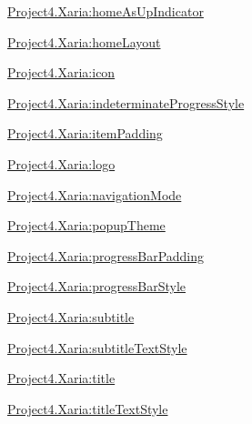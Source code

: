 {\ttfamily \hyperlink{classproject4_1_1xaria_1_1R_1_1styleable_ab5053df37af5d2ea8d603211b589c775}{Project4.\+Xaria\+:home\+As\+Up\+Indicator}}

{\ttfamily \hyperlink{classproject4_1_1xaria_1_1R_1_1styleable_a3c2746f97e4f1d93ae4fd7b0a94e055c}{Project4.\+Xaria\+:home\+Layout}}

{\ttfamily \hyperlink{classproject4_1_1xaria_1_1R_1_1styleable_ac5aaeb633d4d1312de58e956afac37b1}{Project4.\+Xaria\+:icon}}

{\ttfamily \hyperlink{classproject4_1_1xaria_1_1R_1_1styleable_a7b820690f429621509300f757ddbd3da}{Project4.\+Xaria\+:indeterminate\+Progress\+Style}}

{\ttfamily \hyperlink{classproject4_1_1xaria_1_1R_1_1styleable_afead372bec08fa28b16df291eceff099}{Project4.\+Xaria\+:item\+Padding}}

{\ttfamily \hyperlink{classproject4_1_1xaria_1_1R_1_1styleable_a29368a7dcfad1ef0f8e7537d44b3cf41}{Project4.\+Xaria\+:logo}}

{\ttfamily \hyperlink{classproject4_1_1xaria_1_1R_1_1styleable_a8a75ec93401c4f373036ed6d0abe042e}{Project4.\+Xaria\+:navigation\+Mode}}

{\ttfamily \hyperlink{classproject4_1_1xaria_1_1R_1_1styleable_af32e42a2ea26936b7608c41f68c9ae51}{Project4.\+Xaria\+:popup\+Theme}}

{\ttfamily \hyperlink{classproject4_1_1xaria_1_1R_1_1styleable_a99f4af768ba3206b1224f0599aad5fd3}{Project4.\+Xaria\+:progress\+Bar\+Padding}}

{\ttfamily \hyperlink{classproject4_1_1xaria_1_1R_1_1styleable_ae3f1ea6ff103725e559077f1effcb813}{Project4.\+Xaria\+:progress\+Bar\+Style}}

{\ttfamily \hyperlink{classproject4_1_1xaria_1_1R_1_1styleable_a7cca6eb4000951d6b787beaf09c98f90}{Project4.\+Xaria\+:subtitle}}

{\ttfamily \hyperlink{classproject4_1_1xaria_1_1R_1_1styleable_a88fa5db9b1092133d576b1174279baa1}{Project4.\+Xaria\+:subtitle\+Text\+Style}}

{\ttfamily \hyperlink{classproject4_1_1xaria_1_1R_1_1styleable_a5d0e4c195dd446c70c4981931970d991}{Project4.\+Xaria\+:title}}

{\ttfamily \hyperlink{classproject4_1_1xaria_1_1R_1_1styleable_a981a219de0af41bb112ba02e0268fb0b}{Project4.\+Xaria\+:title\+Text\+Style}}

